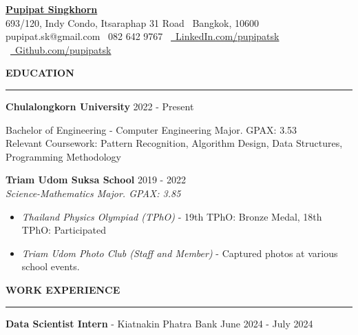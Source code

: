 \documentclass[11pt]{article}
\begin{document}
\begin{center}
    \href{https://pupipatsk.github.io/Resume/}{\Large \textbf{Pupipat Singkhorn}} \\
    693/120, Indy Condo, Itsaraphap 31 Road \textbullet \ Bangkok, 10600 \\
    pupipat.sk@gmail.com \textbullet \ 082 642 9767 \textbullet\ \href{www.linkedin.com/in/pupipatsk}{\faLinkedin\ LinkedIn.com/pupipatsk} \textbullet\ \href{https://github.com/pupipatsk}{\faGithub\ Github.com/pupipatsk}
\end{center}
\textbf{EDUCATION}
\vspace{5pt}
{\color{NavyBlue}\hrule}
\vspace{6pt}

\textbf{Chulalongkorn University} \hfill 2022 - Present

\hspace*{7pt} Bachelor of Engineering - Computer Engineering Major. GPAX: 3.53\\
\hspace*{7pt} Relevant Coursework: Pattern Recognition, Algorithm Design, Data Structures, Programming Methodology

\vspace{2pt}

\textbf{Triam Udom Suksa School} \hfill 2019 - 2022\\
\textit{Science-Mathematics Major. GPAX: 3.85}

\begin{itemize}[noitemsep, topsep=0pt, partopsep=0pt, parsep=0pt]
    \item \textit{Thailand Physics Olympiad (TPhO)} - 19th TPhO: Bronze Medal, 18th TPhO: Participated
    \item \textit{Triam Udom Photo Club (Staff and Member)} - Captured photos at various school events.
\end{itemize}

\vspace{9pt}
\textbf{WORK EXPERIENCE}
\vspace{5pt}
{\color{NavyBlue}\hrule}
\vspace{6pt}

\textbf{Data Scientist Intern} - Kiatnakin Phatra Bank \hfill June 2024 - July 2024
\end{document}
